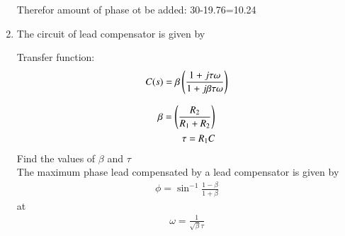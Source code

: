 \begin{enumerate}[label=\thesection.\arabic*.,ref=\thesection.\theenumi]
Therefor amount of phase ot be added: 30-19.76=10.24





\item The circuit of lead compensator is given by
\begin{figure}[!ht]
    \centering
	\resizebox{\columnwidth}{!}{}
\caption{}
\label{fig:ee18btech11036_ckt}
\end{figure}

Transfer function:
\begin{align}
C(s)=\beta\brak{\frac{1+j\tau\omega}{1+j\beta\tau\omega}}
\label{eq:ee18btech11036_compensator}
\end{align}

\begin{align}
\beta=\brak{\frac{R_2}{R_1+R_2}}\\
\tau =R_1C
\label{eq:ee18btech11036_values}
\end{align}
Find the values of $\beta$ and $\tau$\\
\solution The maximum phase lead compensated by a lead compensator is given by\\
\begin{align}
\phi={\sin}^{-1}\frac{1-\beta}{1+\beta}
\label{eq:ee18btech11036_beta}
\end{align}
at
\begin{align}
\omega =\frac{1}{\sqrt{\beta}\tau}
\label{eq:ee18btech11036_omega}
\end{align}


\end{enumerate}
